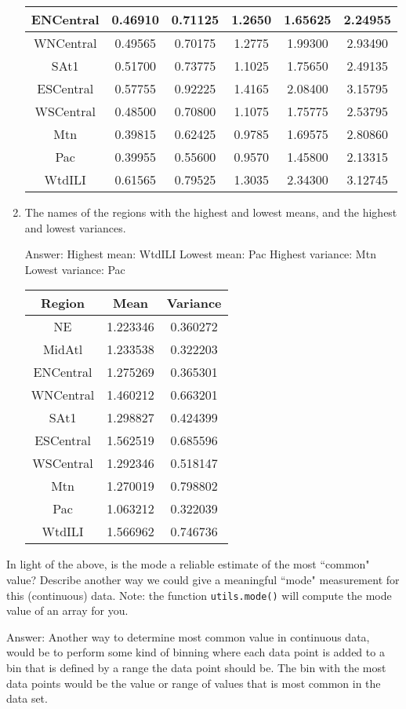 \documentclass{article}
\newcommand{\blu}[1]{{\textcolor{blu}{#1}}}
\newcommand{\gre}[1]{\textcolor{gre}{#1}}
\newcommand\ans[1]{\par\gre{Answer: #1}}
\let\ask\blu
\begin{document}
\begin{enumerate}
{\begin{table}[htbp]
\begin{tabular}{|c|c|c|c|c|c|}
ENCentral   & 0.46910  & 0.71125  & 1.2650  & 1.65625  & 2.24955 \\ \hline
WNCentral   & 0.49565  & 0.70175  & 1.2775  & 1.99300  & 2.93490 \\ \hline
SAt1        & 0.51700  & 0.73775  & 1.1025  & 1.75650  & 2.49135 \\ \hline
ESCentral   & 0.57755  & 0.92225  & 1.4165  & 2.08400  & 3.15795 \\ \hline
WSCentral   & 0.48500  & 0.70800  & 1.1075  & 1.75775  & 2.53795 \\ \hline
Mtn         & 0.39815  & 0.62425  & 0.9785  & 1.69575  & 2.80860 \\ \hline
Pac         & 0.39955  & 0.55600  & 0.9570  & 1.45800  & 2.13315 \\ \hline
WtdILI      & 0.61565  & 0.79525  & 1.3035  & 2.34300  & 3.12745 \\ \hline
\end{tabular}
\end{table}
  }
  \item The names of the regions with the highest and lowest means, and the highest and lowest variances.
  \ans{
  Highest mean: WtdILI
\newline
Lowest mean: Pac
\newline
Highest variance: Mtn
\newline
Lowest variance: Pac
\begin{table}[htbp]
\centering
\begin{tabular}{|c|c|c|}
\hline
\textbf{Region} & \textbf{Mean} & \textbf{Variance} \\ \hline
NE          & 1.223346  & 0.360272 \\ \hline
MidAtl      & 1.233538  & 0.322203 \\ \hline
ENCentral   & 1.275269  & 0.365301 \\ \hline
WNCentral   & 1.460212  & 0.663201 \\ \hline
SAt1        & 1.298827  & 0.424399 \\ \hline
ESCentral   & 1.562519  & 0.685596 \\ \hline
WSCentral   & 1.292346  & 0.518147 \\ \hline
Mtn         & 1.270019  & 0.798802 \\ \hline
Pac         & 1.063212  & 0.322039 \\ \hline
WtdILI      & 1.566962  & 0.746736 \\ \hline
\end{tabular}
\end{table}
  }
  \end{enumerate}
  In light of the above, \ask{is the mode a reliable estimate of the most ``common" value? Describe another way we could give a meaningful ``mode" measurement for this (continuous) data.} Note: the function \texttt{utils.mode()} will compute the mode value of an array for you.
\ans{Another way to determine most common value in continuous data, would be to perform some kind of binning where each data point is added to a bin that is defined by a range the data point should be. The bin with the most data points would be the value or range of values that is most common in the data set.}
  \newpage
\end{document}
